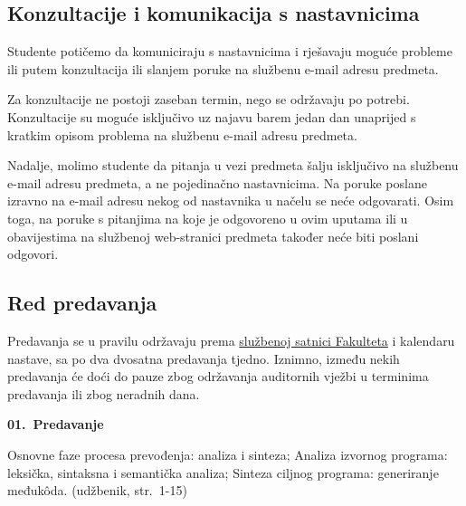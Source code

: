 \documentclass[times, 12pt, utf8]{book}
\newenvironment{myindentpar}[1]%
{\begin{list}{}%
         {\setlength{\leftmargin}{#1}}%
         \item[]%
}
{\end{list}}
\begin{document}
\subsection*{Konzultacije i komunikacija s nastavnicima}

Studente potičemo da komuniciraju s nastavnicima i rješavaju moguće probleme ili putem konzultacija ili slanjem poruke na službenu e-mail adresu predmeta.

Za konzultacije ne postoji zaseban termin, nego se održavaju po potrebi.
Konzultacije su moguće isključivo uz najavu barem jedan dan unaprijed s kratkim opisom problema na službenu e-mail adresu predmeta.

Nadalje, molimo studente da pitanja u vezi predmeta šalju isključivo na službenu e-mail adresu predmeta, a ne pojedinačno nastavnicima. 
Na poruke poslane izravno na e-mail adresu nekog od nastavnika u načelu se neće odgovarati.
Osim toga, na poruke s pitanjima na koje je odgovoreno u ovim uputama ili u obavijestima na službenoj web-stranici predmeta također neće biti poslani odgovori.

\begin{comment}
\cleardoublepage  
\phantomsection  
\addcontentsline{toc}{section}{Administracija bodova}
\subsection*{Administracija}

Za unos i pregled obaveza na predmetu i svih bodova koristi se informacijski sustav \href{http://ferko.fer.hr}{FERKO}.
Molimo studente da porukom na službenu e-mail adresu predmeta na vrijeme dojave moguće pogreške u unosu bodova.

\end{comment}

\cleardoublepage  
{}  
{}
\subsection*{Red predavanja}

Predavanja se u pravilu održavaju prema \href{http://web.zpr.fer.hr/satnica1/predmeti.htm}{službenoj satnici Fakulteta} i kalendaru nastave, sa po dva dvosatna predavanja tjedno.
Iznimno, između nekih predavanja će doći do pauze zbog održavanja auditornih vježbi u terminima predavanja ili zbog neradnih dana.

\textbf{01.~Predavanje} 
\begin{myindentpar}{30pt}
Osnovne faze procesa prevođenja: analiza i sinteza; Analiza izvornog programa: leksička, sintaksna i semantička analiza; Sinteza ciljnog programa: generiranje međukôda. (udžbenik, str.~1-15)
\end{myindentpar}
\end{document}
